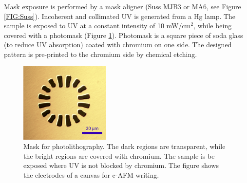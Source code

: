\documentclass[pdflatex, sectionletters, 12pt]{pittetd}    %
\begin{document}
Mask exposure is performed by a mask aligner (Suss MJB3 or MA6, see Figure \ref{FIG:Suss}). Incoherent and collimated UV is generated from a Hg lamp. The sample is exposed to UV at a constant intensity of 10 mW/cm$^2$, while being covered with a photomask (Figure \ref{FIG:MASK}). Photomask is a square piece of soda glass (to reduce UV absorption) coated with chromium on one side. The designed pattern is pre-printed to the chromium side by chemical etching.
\\

\begin{figure}[h!]
	\centering
	\includegraphics[width=0.4\textwidth]{Drawing/MASK.png}
	\caption{Mask for photolithography. The dark regions are transparent, while the bright regions are covered with chromium. The sample is be exposed where UV is not blocked by chromium. The figure shows the electrodes of a canvas for c-AFM writing.}
	\label{FIG:MASK}
\end{figure}
\end{document}

